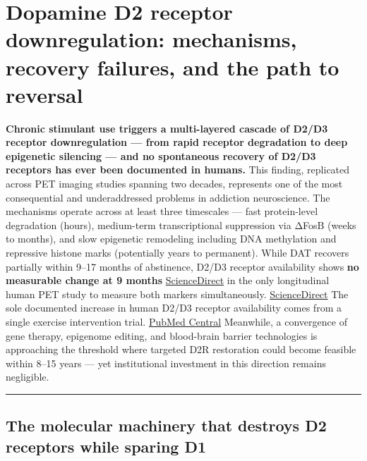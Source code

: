 ﻿\section{Dopamine D2 receptor downregulation: mechanisms, recovery failures, and the path to reversal}\label{15_d2_downregulation-dopamine-d2-receptor-downregulation-mechanisms-recovery-failures-and-the-path-to-reversal}

\textbf{Chronic stimulant use triggers a multi-layered cascade of D2/D3 receptor downregulation --- from rapid receptor degradation to deep epigenetic silencing --- and no spontaneous recovery of D2/D3 receptors has ever been documented in humans.} This finding, replicated across PET imaging studies spanning two decades, represents one of the most consequential and underaddressed problems in addiction neuroscience. The mechanisms operate across at least three timescales --- fast protein-level degradation (hours), medium-term transcriptional suppression via ΔFosB (weeks to months), and slow epigenetic remodeling including DNA methylation and repressive histone marks (potentially years to permanent). While DAT recovers partially within 9--17 months of abstinence, D2/D3 receptor availability shows \textbf{no measurable change at 9 months} \href{https://www.sciencedirect.com/science/article/abs/pii/S1053811915006461}{ScienceDirect} in the only longitudinal human PET study to measure both markers simultaneously. \href{https://www.sciencedirect.com/science/article/abs/pii/S1053811915006461}{ScienceDirect} The sole documented increase in human D2/D3 receptor availability comes from a single exercise intervention trial. \href{https://pmc.ncbi.nlm.nih.gov/articles/PMC4832026/}{PubMed Central} Meanwhile, a convergence of gene therapy, epigenome editing, and blood-brain barrier technologies is approaching the threshold where targeted D2R restoration could become feasible within 8--15 years --- yet institutional investment in this direction remains negligible.

\begin{center}\rule{0.5\linewidth}{0.5pt}\end{center}

\subsection{The molecular machinery that destroys D2 receptors while sparing D1}\label{15_d2_downregulation-the-molecular-machinery-that-destroys-d2-receptors-while-sparing-d1}

